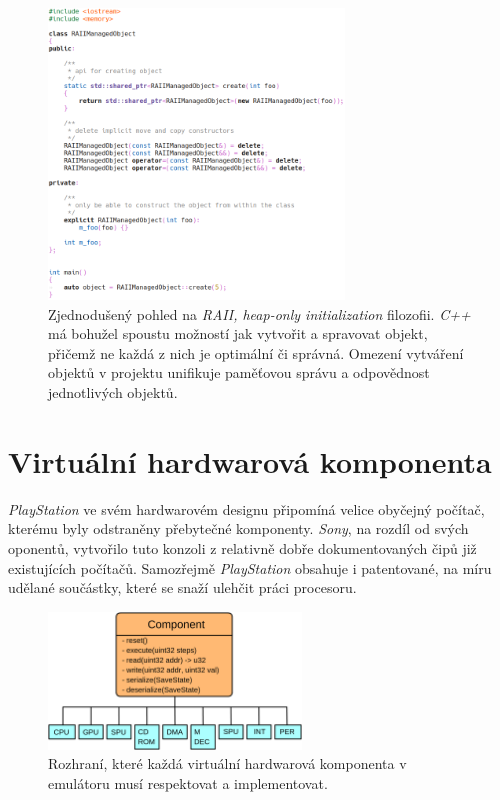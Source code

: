 \begin{figure}[hbt]
    \centering
    \includegraphics[width=0.7\textwidth]{obrazky-figures/raii.png}
    \caption[\textit{RAII + heap-only initialization}]{Zjednodušený pohled na \textit{RAII, heap-only initialization} filozofii. \textit{C++} má bohužel spoustu možností jak vytvořit a spravovat objekt, 
    přičemž ne každá z nich je optimální či správná. Omezení vytváření objektů v projektu unifikuje paměťovou správu a odpovědnost jednotlivých objektů.}
    \label{raii-heap-only}
\end{figure}

\section{Virtuální hardwarová komponenta}

\textit{PlayStation} ve svém hardwarovém designu připomíná velice obyčejný počítač, kterému byly odstraněny přebytečné komponenty.
\textit{Sony}, na rozdíl od svých oponentů, vytvořilo tuto konzoli z relativně dobře dokumentovaných čipů již existujících počítačů. 
Samozřejmě \textit{PlayStation} obsahuje i patentované, na míru udělané součástky, které se snaží ulehčit práci procesoru.

\begin{figure}[hbt]
    \centering
    \includegraphics[width=0.6\textwidth]{obrazky-figures/component.png}
    \caption[Rozhraní hardwarové komponenty]{Rozhraní, které každá virtuální hardwarová komponenta v emulátoru musí respektovat a implementovat.}
    \label{component}
\end{figure}

